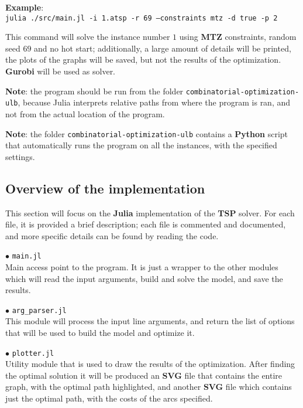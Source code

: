 \documentclass[
12pt,
a4paper,
oneside,
headinclude,
footinclude]{article}
\begin{document}
    \textbf{Example}:\\
    \quad\texttt{julia ./src/main.jl -i 1.atsp -r 69 --constraints mtz -d true -p 2}
    
    This command will solve the instance number $1$ using \textbf{MTZ} constraints, random seed $69$ and no hot start; additionally, a large amount of details will be printed, the plots of the graphs will be saved, but not the results of the optimization. \textbf{Gurobi} will be used as solver.
    
    \textbf{Note}: the program should be run from the folder \texttt{combinatorial-optimization-ulb}, because Julia interprets relative paths from where the program is ran, and not from the actual location of the program.
    
    \textbf{Note}: the folder \texttt{combinatorial-optimization-ulb} contains a \textbf{Python} script that automatically runs the program on all the instances, with the specified settings.
    
    
        
    \newpage
    \subsection{Overview of the implementation}
   
    This section will focus on the \textbf{Julia} implementation of the \textbf{TSP} solver.
    For each file, it is provided a brief description; each file is commented and documented, and more specific details can be found by reading the code.
    
    $\bullet$ \texttt{main.jl}\\
    Main access point to the program. It is just a wrapper to the other modules which will read the input arguments, build and solve the model, and save the results.
    
    $\bullet$ \texttt{arg\_parser.jl}\\
    This module will process the input line arguments, and return the list of options that will be used to build the model and optimize it.
    
    $\bullet$ \texttt{plotter.jl}\\
    Utility module that is used to draw the results of the optimization. After finding the optimal solution it will be produced an \textbf{SVG} file that contains the entire graph, with the optimal path highlighted, and another \textbf{SVG} file which contains just the optimal path, with the costs of the arcs specified.
    
\end{document}
